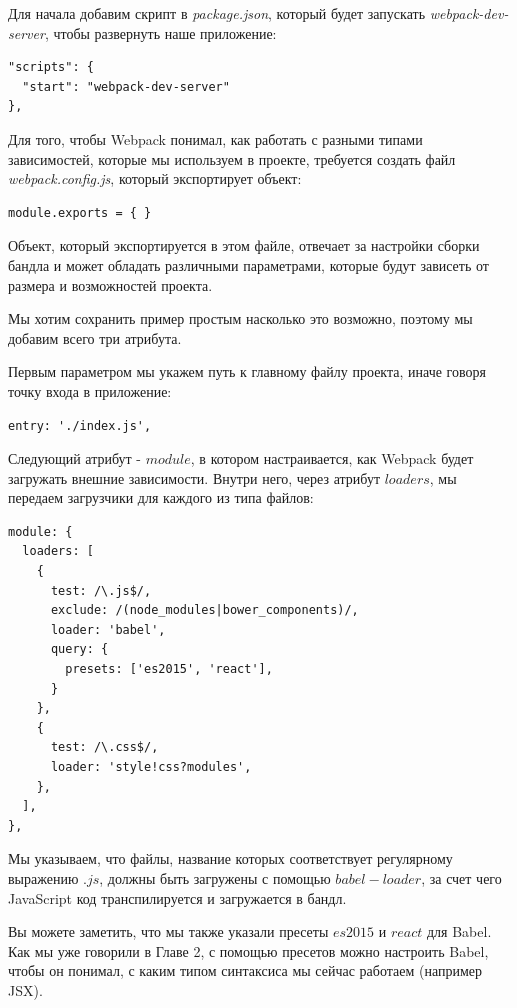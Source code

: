 Для начала добавим скрипт в \textit{package.json}, который будет запускать \textit{webpack-dev-server}, чтобы развернуть наше приложение:

\begin{lstlisting}
"scripts": {
  "start": "webpack-dev-server"
},
\end{lstlisting}

Для того, чтобы Webpack понимал, как работать с разными типами зависимостей, которые мы используем в проекте, требуется создать файл \textit{webpack.config.js}, который экспортирует объект:

\begin{lstlisting}
module.exports = { }
\end{lstlisting}

Объект, который экспортируется в этом файле, отвечает за настройки сборки бандла и может обладать различными параметрами, которые будут зависеть от размера и возможностей проекта.

Мы хотим сохранить пример простым насколько это возможно, поэтому мы добавим всего три атрибута.

Первым параметром мы укажем путь к главному файлу проекта, иначе говоря точку входа в приложение:

\begin{lstlisting}
entry: './index.js',
\end{lstlisting}

Следующий атрибут - $module$, в котором настраивается, как Webpack будет загружать внешние зависимости. Внутри него, через атрибут $loaders$, мы передаем загрузчики для каждого из типа файлов:

\begin{lstlisting}
module: {
  loaders: [
    {
      test: /\.js$/,
      exclude: /(node_modules|bower_components)/,
      loader: 'babel',
      query: {
        presets: ['es2015', 'react'],
      }
    }, 
    {
      test: /\.css$/,
      loader: 'style!css?modules',
    },
  ],
},
\end{lstlisting}
 
Мы указываем, что файлы, название которых соответствует регулярному выражению $.js$, должны быть загружены с помощью $babel-loader$, за счет чего JavaScript код транспилируется и загружается в бандл.

Вы можете заметить, что мы также указали пресеты $es2015$ и $react$ для Babel. Как мы уже говорили в Главе 2, с помощью пресетов можно настроить Babel, чтобы он понимал, с каким типом синтаксиса мы сейчас работаем (например JSX).

